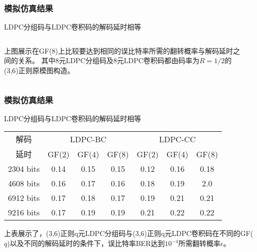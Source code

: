 \documentclass{beamer}
\begin{document}
\begin{frame}[shrink]
	\frametitle{模拟仿真结果}
		\begin{block}{LDPC分组码与LDPC卷积码的解码延时相等}
		\begin{columns}
		\begin{column}{0.4\textwidth}
		上图展示在GF($8$)上比较要达到相同的误比特率所需的翻转概率与解码延时之间的关系。
其中8元LDPC分组码及8元LDPC卷积码都由码率为$R=1/2$的(3,6)正则原模图构造。
		\end{column}
		\begin{column}{0.6\textwidth}
		\begin{center}
\end{center}
		\end{column}
		\end{columns}
		\end{block}
\end{frame}
\begin{frame}[shrink]
	\frametitle{模拟仿真结果}
		\begin{block}{LDPC分组码与LDPC卷积码的解码延时相等}
		\begin{center}
		\begin{tabular}{|c|c|c|c|c|c|c|}
 \hline
解码 & \multicolumn{3}{|c|}{LDPC-BC} & \multicolumn{3}{|c|}{LDPC-CC} \\ \cline{2-7}
延时 & GF(2) & GF(4) & GF(8) & GF(2) & GF(4) & GF(8) \\ \hline
2304 bits & 0.14 & 0.15 & 0.15 & 0.12 & 0.16 & 0.18\\ \hline
4608 bits & 0.16 & 0.17 & 0.16 & 0.18 & 0.19 & 2.0\\ \hline
6912 bits & 0.17 & 0.18 & 0.17 & 0.19 & 0.21 & 0.21\\ \hline
9216 bits & 0.17 & 0.19 & 0.19 & 0.21 & 0.22 & 0.22\\ \hline
\end{tabular}
\end{center}
上表展示了，(3,6)正则q元LDPC分组码与(3,6)正则q元LDPC卷积码在不同的GF($q$)以及不同的解码延时的条件下，误比特率BER达到$10^{-4}$所需翻转概率$\epsilon$。
		\end{block}
\end{frame}
\end{document}
